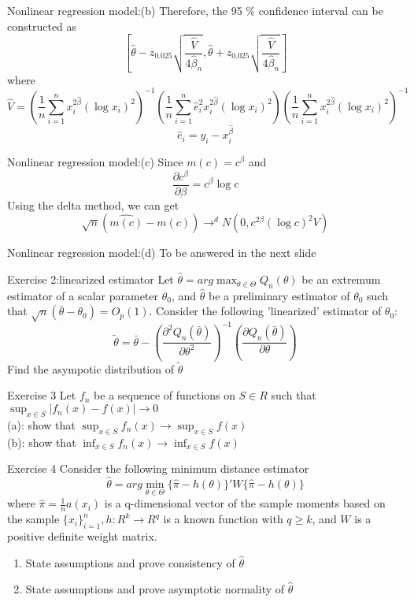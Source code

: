 \documentclass{beamer}
\begin{document}
\begin{frame}{Nonlinear regression model:(b)} 
	Therefore, the 95 \% confidence interval can be constructed as
	\[ [\hat{\theta} - z_{0.025} \sqrt{\frac{\hat{V}}{4 \hat{\beta}_n}}, \hat{\theta} + z_{0.025} \sqrt{\frac{\hat{V}}{4 \hat{\beta}_n}}]\]
	where
	\[\hat{V} = (\frac{1}{n} \sum^n_{i=1} x^{2\hat{\beta}}_i(\log x_i)^2)^{-1} (\frac{1}{n} \sum^n_{i=1} \hat{e}^2_i x^{2\hat{\beta}}_i(\log x_i)^2)(\frac{1}{n} \sum^n_{i=1} x^{2\hat{\beta}}_i(\log x_i)^2)^{-1} \]
	\[\hat{e}_i = y_i - x^{\hat{\beta}}_i\]
\end{frame}
\begin{frame}{Nonlinear regression model:(c)}
Since $m(c) = c^{\beta}$ and 
\[\frac{\partial c^{\beta}}{\partial \beta} = c^{\beta} \log c\]
Using the delta method, we can get 
\[\sqrt{n}(\hat{m(c)} - m(c)) \rightarrow^d N(0,c^{2\beta} (\log c)^2 V) \]
\end{frame}
\begin{frame}{Nonlinear regression model:(d)}
To be answered in the next slide
\end{frame}
\begin{frame}{Exercise 2:linearized  estimator}
	Let $\hat{\theta} = arg\max_{\theta \in \Theta} Q_n(\theta)$ be an extremum estimator of a scalar parameter $\theta_0$, and $\hat{\theta}$ be a preliminary estimator of $\theta_0$ such that $\sqrt{n}(\bar{\theta}-\theta_0) = O_p(1)$. Consider the following 'linearized' estimator of $\theta_0$:
	\[\tilde{\theta} = \bar{\theta} - (\frac{\partial^2 Q_n(\bar{\theta})}{\partial \theta^2})^{-1} (\frac{\partial Q_n(\bar{\theta})}{\partial \theta}) \]
	Find the asympotic distribution of $\tilde{\theta}$ 
\end{frame}
\begin{frame}{Exercise 3}
	Let $f_n$ be a sequence of functions on $S \in R$ such that $\sup_{x \in S} |f_n(x) - f(x)| \rightarrow 0$ \\
	(a): show that $\sup_{x \in S} f_n(x) \rightarrow \sup_{x \in S} f(x)$ \\
	(b): show that $\inf_{x \in S} f_n(x) \rightarrow \inf_{x \in S} f(x)$
\end{frame}
\begin{frame}{Exercise 4}
	Consider the following minimum distance estimator
	\[\hat{\theta} = arg \min_{\theta \in \Theta} \{\hat{\pi} - h(\theta)\}' W \{\hat{\pi} - h(\theta)\}\]
	where $\hat{\pi} = \frac{1}{n} a(x_i)$ is a q-dimensional vector of the sample moments based on the sample $\{x_i\}^n_{i=1}, h:R^k \rightarrow R^q$ is a known function with $q \geq k$, and $W$ is a positive definite weight matrix. 
	\begin{enumerate}
		\item State assumptions and prove consistency of $\hat{\theta}$
		\item State assumptions and prove asymptotic normality of $\hat{\theta}$
	\end{enumerate}
\end{frame}
\end{document}
